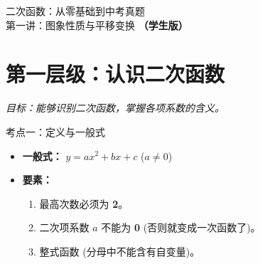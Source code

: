 \documentclass[12pt, a4paper]{article}
\begin{document}
\begin{center}
    { \heiti 二次函数：从零基础到中考真题} \\
    \vspace{0.1cm}
    {\large \kaishu 第一讲：图象性质与平移变换 \textbf{（学生版）}}
\end{center}

\vspace{0.1cm}

\begin{center}
\end{center}

\vspace{0.3cm}

\section{第一层级：认识二次函数}
\textit{目标：能够识别二次函数，掌握各项系数的含义。}

\begin{conceptbox}{考点一：定义与一般式}
    \begin{itemize}
        \item \textbf{一般式：} $y = ax^2 + bx + c$ \quad ($a \neq 0$)
        \item \textbf{要素：} 
        \begin{enumerate}
            \item 最高次数必须为 \textbf{2}。
            \item 二次项系数 $a$ 不能为 \textbf{0} (否则就变成一次函数了)。
            \item 整式函数 (分母中不能含有自变量)。
        \end{enumerate}
    \end{itemize}
\end{conceptbox}
\end{document}
